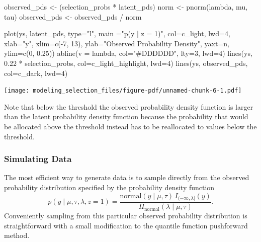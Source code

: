 \documentclass[
  letterpaper,
  DIV=11,
  numbers=noendperiod]{scrartcl}
\newenvironment{Shaded}{\begin{snugshade}}{\end{snugshade}}
\newcommand{\AttributeTok}[1]{\textcolor[rgb]{0.40,0.45,0.13}{#1}}
\newcommand{\DecValTok}[1]{\textcolor[rgb]{0.68,0.00,0.00}{#1}}
\newcommand{\FloatTok}[1]{\textcolor[rgb]{0.68,0.00,0.00}{#1}}
\newcommand{\FunctionTok}[1]{\textcolor[rgb]{0.28,0.35,0.67}{#1}}
\newcommand{\NormalTok}[1]{\textcolor[rgb]{0.00,0.23,0.31}{#1}}
\newcommand{\OtherTok}[1]{\textcolor[rgb]{0.00,0.23,0.31}{#1}}
\newcommand{\SpecialCharTok}[1]{\textcolor[rgb]{0.37,0.37,0.37}{#1}}
\newcommand{\StringTok}[1]{\textcolor[rgb]{0.13,0.47,0.30}{#1}}
\begin{document}
\begin{Shaded}
\begin{Highlighting}[]
\NormalTok{observed\_pds }\OtherTok{\textless{}{-}}\NormalTok{ (selection\_probs }\SpecialCharTok{*}\NormalTok{ latent\_pds)}
\NormalTok{norm }\OtherTok{\textless{}{-}} \FunctionTok{pnorm}\NormalTok{(lambda, mu, tau)}
\NormalTok{observed\_pds }\OtherTok{\textless{}{-}}\NormalTok{ observed\_pds }\SpecialCharTok{/}\NormalTok{ norm}

\FunctionTok{plot}\NormalTok{(ys, latent\_pds, }\AttributeTok{type=}\StringTok{"l"}\NormalTok{, }\AttributeTok{main =}\StringTok{"p(y | z = 1)"}\NormalTok{, }\AttributeTok{col=}\NormalTok{c\_light, }\AttributeTok{lwd=}\DecValTok{4}\NormalTok{,}
     \AttributeTok{xlab=}\StringTok{"y"}\NormalTok{, }\AttributeTok{xlim=}\FunctionTok{c}\NormalTok{(}\SpecialCharTok{{-}}\DecValTok{7}\NormalTok{, }\DecValTok{13}\NormalTok{),}
     \AttributeTok{ylab=}\StringTok{"Observed Probability Density"}\NormalTok{, }\AttributeTok{yaxt=}\StringTok{\textquotesingle{}n\textquotesingle{}}\NormalTok{, }\AttributeTok{ylim=}\FunctionTok{c}\NormalTok{(}\DecValTok{0}\NormalTok{, }\FloatTok{0.25}\NormalTok{))}
\FunctionTok{abline}\NormalTok{(}\AttributeTok{v =}\NormalTok{ lambda, }\AttributeTok{col=}\StringTok{"\#DDDDDD"}\NormalTok{, }\AttributeTok{lty=}\DecValTok{3}\NormalTok{, }\AttributeTok{lwd=}\DecValTok{4}\NormalTok{)}
\FunctionTok{lines}\NormalTok{(ys, }\FloatTok{0.22} \SpecialCharTok{*}\NormalTok{ selection\_probs, }\AttributeTok{col=}\NormalTok{c\_light\_highlight, }\AttributeTok{lwd=}\DecValTok{4}\NormalTok{)}
\FunctionTok{lines}\NormalTok{(ys, observed\_pds, }\AttributeTok{col=}\NormalTok{c\_dark, }\AttributeTok{lwd=}\DecValTok{4}\NormalTok{)}
\end{Highlighting}
\end{Shaded}

\texttt{[image: modeling\_selection\_files/figure-pdf/unnamed-chunk-6-1.pdf]}

Note that below the threshold the observed probability density function
is larger than the latent probability density function because the
probability that would be allocated above the threshold instead has to
be reallocated to values below the threshold.

\subsubsection{Simulating Data}\label{simulating-data}

The most efficient way to generate data is to sample directly from the
observed probability distribution specified by the probability density
function \[
p(y \mid \mu, \tau, \lambda, z = 1)
=
\frac{ \text{normal}(y \mid \mu, \tau) \, I_{(-\infty, \lambda]}(y) }
{ \Pi_{\text{normal}}(\lambda \mid \mu, \tau) }.
\] Conveniently sampling from this particular observed probability
distribution is straightforward with a small modification to the
quantile function pushforward method.
\end{document}

